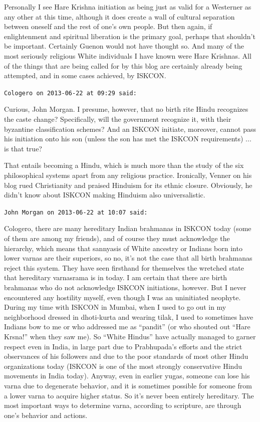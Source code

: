 \begin{footnotesize}
\begin{sffamily}
Personally I see Hare Krishna initiation as being just as valid for a Westerner as any other at this time, although it does create a wall of cultural separation between oneself and the rest of one's own people. But then again, if enlightenment and spiritual liberation is the primary goal, perhaps that shouldn't be important. Certainly Guenon would not have thought so. And many of the most seriously religious White individuals I have known were Hare Krishnas. All of the things that are being called for by this blog are certainly already being attempted, and in some cases achieved, by ISKCON.

\hfill

\texttt{Cologero on 2013-06-22 at 09:29 said:}

Curious, John Morgan. I presume, however, that no birth rite Hindu recognizes the caste change? Specifically, will the government recognize it, with their byzantine classification schemes? And an ISKCON initiate, moreover, cannot pass his initiation onto his son (unless the son has met the ISKCON requirements) ... is that true?

That entails becoming a Hindu, which is much more than the study of the six philosophical systems apart from any religious practice. Ironically, Venner on his blog rued Christianity and praised Hinduism for its ethnic closure. Obviously, he didn't know about ISKCON making Hinduism also universalistic.

\hfill

\texttt{John Morgan on 2013-06-22 at 10:07 said:}

Cologero, there are many hereditary Indian brahmanas in ISKCON today (some of them are among my friends), and of course they must acknowledge the hierarchy, which means that sannyasis of White ancestry or Indians born into lower varnas are their superiors, so no, it's not the case that all birth brahmanas reject this system. They have seen firsthand for themselves the wretched state that hereditary varnasrama is in today. I am certain that there are birth brahmanas who do not acknowledge ISKCON initiations, however. But I never encountered any hostility myself, even though I was an uninitiated neophyte. During my time with ISKCON in Mumbai, when I used to go out in my neighborhood dressed in dhoti-kurta and wearing tilak, I used to sometimes have Indians bow to me or who addressed me as ``pandit'' (or who shouted out ``Hare Krsna!'' when they saw me). So ``White Hindus'' have actually managed to garner respect even in India, in large part due to Prabhupada's efforts and the strict observances of his followers and due to the poor standards of most other Hindu organizations today (ISKCON is one of the most strongly conservative Hindu movements in India today). Anyway, even in earlier yugas, someone can lose his varna due to degenerate behavior, and it is sometimes possible for someone from a lower varna to acquire higher status. So it's never been entirely hereditary. The most important ways to determine varna, according to scripture, are through one's behavior and actions.


\end{sffamily}
\end{footnotesize}
